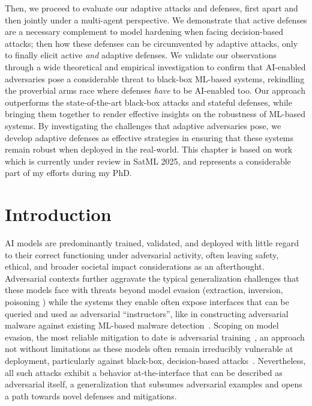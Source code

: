 Then, we proceed to evaluate our adaptive attacks and defenses, first apart and then jointly under a multi-agent perspective.
We demonstrate that active defenses are a necessary complement to model hardening when facing decision-based attacks; then how these defenses can be circumvented by adaptive attacks, only to finally elicit active \emph{and} adaptive defenses.
We validate our observations through a wide theoretical and empirical investigation to confirm that AI-enabled adversaries pose a considerable threat to black-box ML-based systems, rekindling the proverbial arms race where defenses \emph{have} to be AI-enabled too.
Our approach outperforms the state-of-the-art black-box attacks and stateful defenses, while bringing them together to render effective insights on the robustness of ML-based systems.
By investigating the challenges that adaptive adversaries pose, we develop adaptive defenses as effective strategies in ensuring that these systems remain robust when deployed in the real-world.
This chapter is based on work which is currently under review in SatML 2025, and represents a considerable part of my efforts during my PhD.

\section{Introduction}

AI models are predominantly trained, validated, and deployed with little regard to their correct functioning under adversarial activity, often leaving safety, ethical, and broader societal impact considerations as an afterthought.
Adversarial contexts further aggravate the typical generalization challenges that these models face with threats beyond model evasion (extraction, inversion, poisoning \cite{he2020towards}) while the systems they enable often expose interfaces that can be queried and used as adversarial ``instructors'', like in constructing adversarial malware against existing ML-based malware detection~\cite{anderson2018learning, demetrio2021functionality}.
Scoping on model evasion, the most reliable mitigation to date is adversarial training~\cite{madry2017towards, wang2019convergence}, an approach not without limitations as these models often remain irreducibly vulnerable at deployment, particularly against black-box, decision-based attacks~\cite{brendel2018decision, chen2020hopskipjumpattack, yan2020policy}.
Nevertheless, all such attacks exhibit a behavior at-the-interface that can be described as adversarial itself, a generalization that subsumes adversarial examples and opens a path towards novel defenses and mitigations.

